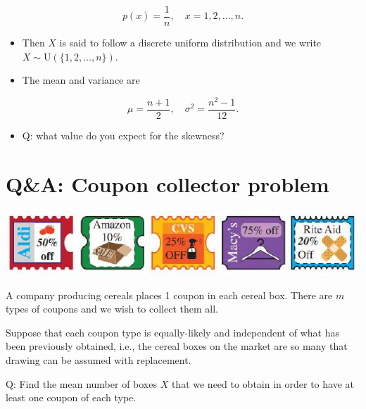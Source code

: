 \documentclass[10pt]{article}
\begin{document}
$$
p(x)=\frac{1}{n}, \quad x=1,2, \ldots, n .
$$

\begin{itemize}
  \item Then $X$ is said to follow a discrete uniform distribution and we write $X \sim \mathrm{U}(\{1,2, \ldots, n\})$.
  \item The mean and variance are
\end{itemize}

$$
\mu=\frac{n+1}{2}, \quad \sigma^{2}=\frac{n^{2}-1}{12} .
$$

\begin{itemize}
  \item Q: what value do you expect for the skewness?
\end{itemize}

\section*{Q\&A: Coupon collector problem}
\begin{center}
\includegraphics[max width=\textwidth]{2025_05_11_35704811148ad612caa6g-40}
\end{center}

A company producing cereals places 1 coupon in each cereal box. There are $m$ types of coupons and we wish to collect them all.

Suppose that each coupon type is equally-likely and independent of what has been previously obtained, i.e., the cereal boxes on the market are so many that drawing can be assumed with replacement.

Q: Find the mean number of boxes $X$ that we need to obtain in order to have at least one coupon of each type.
\end{document}
